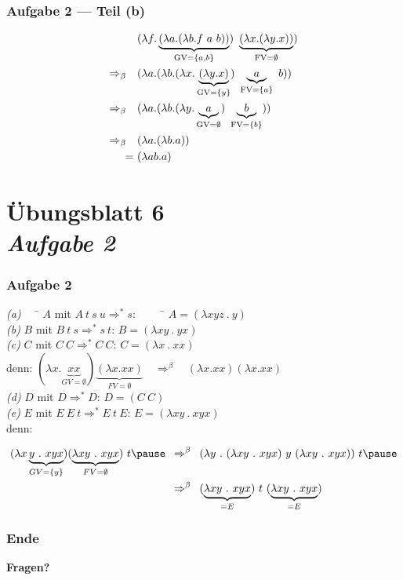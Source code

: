 \documentclass{beamer}
\DeclareMathOperator{\GV}{GV}
\DeclareMathOperator{\FV}{FV}
\begin{document}
\begin{frame} \frametitle{Aufgabe 2 --- Teil (b)}
	\begin{align*}
		& (\lambda f . \underbrace{(\lambda a . (\lambda b . f \ a \ b))}_{\GV = \menge{a,b}}) \ \underbrace{(\lambda x . (\lambda y . x ))}_{\FV= \emptyset}) 
		\\
		\Rightarrow_\beta \quad
		& (\lambda a . (\lambda b . (\lambda x . \underbrace{(\lambda y . x )}_{\GV = \menge{y}}) \ \underbrace{a}_{\FV = \menge{a}} \ b)) 
		\\
		\Rightarrow_\beta \quad
		& (\lambda a . (\lambda b . (\lambda y . \underbrace{a}_{\GV = \emptyset}) \ \underbrace{b}_{\FV = \menge{b}})) 
		\\
		\Rightarrow_\beta \quad
		& (\lambda a . (\lambda b . a)) 
		\\
		= \ & (\lambda ab . a)
	\end{align*}
\end{frame}


\section{Übungsblatt 6 \\ \textit{\normalsize Aufgabe 2}}

\begin{frame} \frametitle{Aufgabe 2}
	\begin{tabbing}
		\emph{(a)} $\quad$ \= $A$ mit $A \ t \ s \ u \Rightarrow^\ast s$:
		\pause $\qquad$ \= $A = (\lambda xyz \ . \ y)$ \\[6pt]
		\pause
		\emph{(b)} \> $B$ mit $B \ t \ s \Rightarrow^\ast s \ t$: 
		\pause \> $B = (\lambda xy \ . \ yx)$ \\[6pt]
		\pause
		\emph{(c)} \> $C$ mit $C \ C \Rightarrow^\ast C \ C$: 
		\pause \> $C =( \lambda x \ . \ xx)$  \\
		\pause \> denn: 
		$(\lambda x . \underbrace{xx}_{GV=\emptyset}) \underbrace{(\lambda x.xx)}_{FV = \emptyset} \quad \Rightarrow^{\beta} \quad (\lambda x . xx) (\lambda x.xx)$ \\[6pt]
		\pause
		\emph{(d)} \> $D$ mit $D \Rightarrow^\ast D$: 
		\pause \> $D = (C \ C)$ \\[6pt]
		\pause	
		\emph{(e)} \> $E$ mit $E \ E \ t \Rightarrow^\ast E \ t \ E$: 
		\pause \> $E = (\lambda xy \ . \ xyx)$ \\ \pause
		\> denn:
	\end{tabbing}
	\small
	\begin{align*}
		(\lambda x\underbrace{y \ . \ xyx}_{GV = \{y\}}) (\underbrace{\lambda xy \ . \ xyx}_{FV = \emptyset}) \ t 
		\pause \enskip &\Rightarrow^{\beta} \enskip
		(\lambda y \ . \ (\lambda xy \ . \ xyx) \ y \ (\lambda xy \ . \ xyx)) \ t 
		\pause \\
		&\Rightarrow^{\beta} \enskip 
		(\underbrace{\lambda xy \ . \ xyx}_{ = E}) \ t \ (\underbrace{\lambda xy \ . \ xyx}_{=E})
	\end{align*}
\end{frame}


\begin{frame} \frametitle{Ende}
	\centering
	\textbf{Fragen?}
\end{frame}
\end{document}
